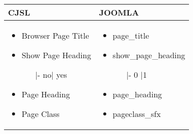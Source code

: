 \begin{minipage}{0.6\textwidth}
\begin{tabular}{|p{}|p{} |}
\hline
\textbf{CJSL} 
&  
\textbf{JOOMLA} \\ \hline
\begin{itemize}
\item Browser Page Title
	\item Show Page Heading
	\begin{enumerate}
	\item[|-]no| yes
	\end{enumerate}
	\item Page Heading
	\item Page Class
\end{itemize}
&
\begin{itemize}
	\item page\_title
	\item show\_page\_heading
	\begin{enumerate}
	\item[|-] 0 |1
	\end{enumerate}
	\item page\_heading
	\item pageclass\_sfx
\end{itemize} \\ \hline
\end{tabular}
\end{minipage}



